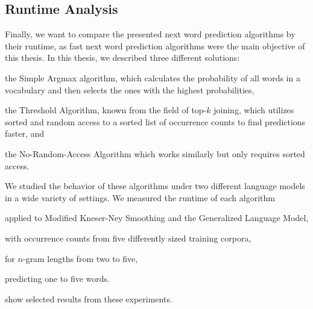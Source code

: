\clearpage
\subsection{Runtime Analysis}
\label{subsec:evaluation-topkjoin-time}

Finally, we want to compare the presented next word prediction algorithms by
their runtime, as fast next word prediction algorithms were the main objective
of this thesis.
In this thesis, we described three different solutions:
\begin{inparaenum}[(1)]
  \item the Simple Argmax algorithm, which calculates the probability of all
    words in a vocabulary and then selects the ones with the highest
    probabilities,
  \item the Threshold Algorithm, known from the field of top-$k$ joining,
    which utilizes sorted and random access to a sorted list of occurrence
    counts to find predictions faster, and
  \item the No-Random-Access Algorithm which works similarly but only requires
    sorted access.
\end{inparaenum}

We studied the behavior of these algorithms under two different language models
in a wide variety of settings.
We measured the runtime of each algorithm
\begin{inparaenum}[(1)]
  \item applied to Modified Kneser-Ney Smoothing and the Generalized Language
    Model,
  \item with occurrence counts from five differently sized training corpora,
  \item for $n$-gram lengths from two to five,
  \item predicting one to five words.
\end{inparaenum}
show selected results from these experiments.

